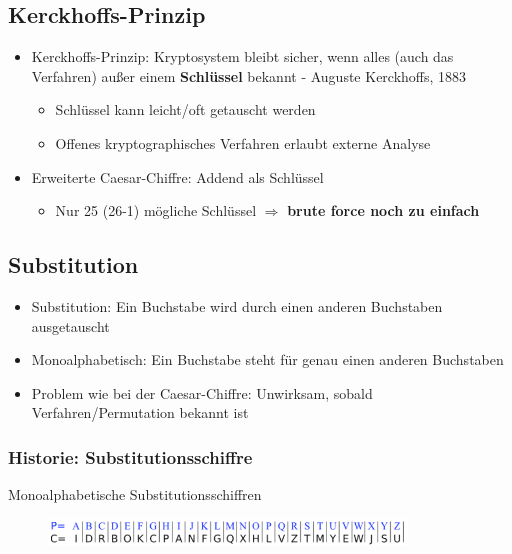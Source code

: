 \documentclass[openany]{book}
\begin{document}
\subsection{Kerckhoffs-Prinzip}

\begin{itemize}
    \item Kerckhoffs-Prinzip: Kryptosystem bleibt sicher, wenn alles (auch das Verfahren) außer einem \textbf{Schlüssel} bekannt - Auguste Kerckhoffs, 1883
    \begin{itemize}
        \item Schlüssel kann leicht/oft getauscht werden
        \item Offenes kryptographisches Verfahren erlaubt externe Analyse \\
    \end{itemize}
    \item Erweiterte Caesar-Chiffre: Addend als Schlüssel
    \begin{itemize}
        \item Nur 25 (26-1) mögliche Schlüssel $\Rightarrow$ \textbf{brute force noch zu einfach}
    \end{itemize}
\end{itemize}

\subsection{Substitution}

\begin{itemize}
    \item Substitution: Ein Buchstabe wird durch einen anderen Buchstaben ausgetauscht
    \item Monoalphabetisch: Ein Buchstabe steht für genau einen anderen Buchstaben
    \item Problem wie bei der Caesar-Chiffre: Unwirksam, sobald Verfahren/Permutation bekannt ist
\end{itemize}

\subsubsection{Historie: Substitutionsschiffre}

Monoalphabetische Substitutionsschiffren

\begin{figure}[h!]
    \centering
    \includegraphics[width=0.85\textwidth]{Pics/Substitution.PNG}
\end{figure}
\end{document}
